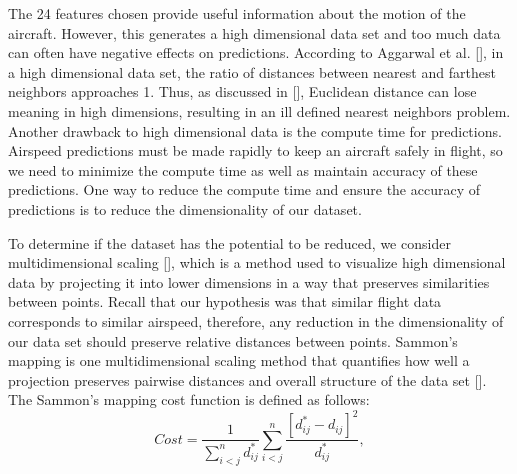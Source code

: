 \documentclass[]{aiaa-tc}
\begin{document}
The 24 features chosen provide useful information about the motion of the aircraft. However, this generates a high dimensional data set and too much data can often have negative effects on predictions. According to Aggarwal et al. [], in a high dimensional data set, the ratio of distances between nearest and farthest neighbors approaches 1. Thus, as discussed in [], Euclidean distance can lose meaning in high dimensions, resulting in an ill defined nearest neighbors problem. Another drawback to high dimensional data is the compute time for predictions. Airspeed predictions must be made rapidly to keep an aircraft safely in flight, so we need to minimize the compute time as well as maintain accuracy of these predictions. One way to reduce the compute time and ensure the accuracy of predictions is to reduce the dimensionality of our dataset.

To determine if the dataset has the potential to be reduced, we consider multidimensional scaling [], which is a method used to visualize high dimensional data by projecting it into lower dimensions in a way that preserves similarities between points. Recall that our hypothesis was that similar flight data corresponds to similar airspeed, therefore, any reduction in the dimensionality of our data set should preserve relative distances between points. Sammon's mapping is one multidimensional scaling method that quantifies how well a projection preserves pairwise distances and overall structure of the data set []. The Sammon's mapping cost function is defined as follows:
\begin{equation} \label{eq:sammon}
Cost = \frac{1}{\sum_{i<j}^n{d^*_{ij}}} \sum_{i<j}^n{\frac{[d^*_{ij} - d_{ij}]^2}{{d^*_{ij}}}},
\end{equation}
\end{document}
